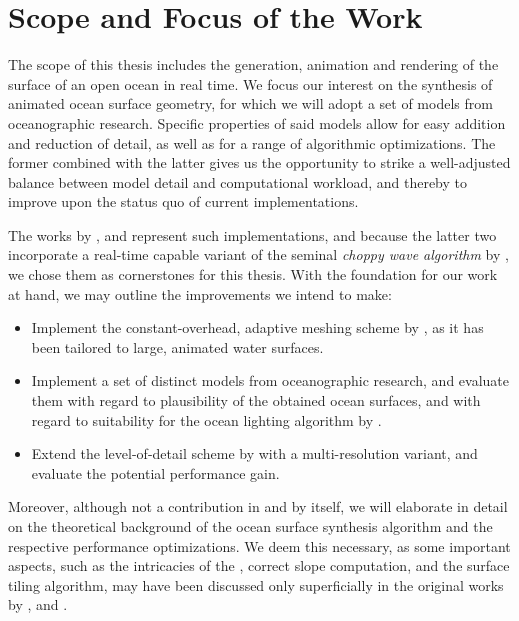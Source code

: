 \section{Scope and Focus of the Work}
\label{sec:scope_and_focus}
The scope of this thesis includes the generation, animation and rendering of the
surface of an open ocean in real time. We focus our interest on the synthesis of
animated ocean surface geometry, for which we will adopt a set of models from
oceanographic research. Specific properties of said models allow for
easy addition and reduction of detail, as well as for a range of algorithmic
optimizations. The former combined with the latter gives us the opportunity to
strike a well-adjusted balance between model detail and computational workload,
and thereby to improve upon the status quo of current implementations.
\textcolor{changed}{
The works by \citet{article:oceanlighting,misc:oceanlightingfft}, and
\citet{article:whitecaps} represent such implementations, and because
the latter two incorporate a real-time capable variant of the seminal
\emph{choppy wave algorithm} by \citet{course:simulatingocean},
we chose them as cornerstones for this thesis. With the foundation for
our work at hand, we may outline the improvements we intend to make:
\begin{itemize}
	\item Implement the constant-overhead, adaptive meshing scheme
	by \citet{thesis:johanson}, as it has been tailored to large,
	animated water surfaces.
	\item Implement a set of distinct models from oceanographic
	research, and evaluate them with regard to plausibility
	of the obtained ocean surfaces, and with regard to suitability
	for the	ocean lighting algorithm by \citet{article:oceanlighting}.
	\item Extend the level-of-detail scheme by
	\citet{misc:oceanlightingfft} with a multi-resolution variant,
	and evaluate the potential performance gain.
\end{itemize}
}
%
\textcolor{changed2}{
Moreover, although not a contribution in and by itself, we will elaborate
in detail on the theoretical background of the ocean surface synthesis
algorithm and the respective performance optimizations. We deem this
necessary, as some important aspects, such as the intricacies of the
\FourierTransform, correct slope computation, and the surface tiling
algorithm, may have been discussed only superficially in the original
works by
\citet{course:simulatingocean,misc:oceanlightingfft},
and \citet{article:whitecaps}.
}
